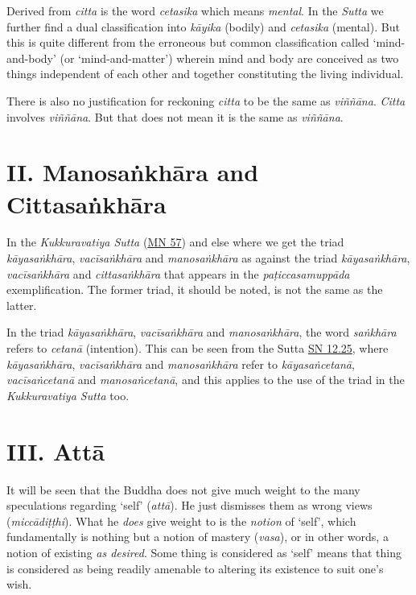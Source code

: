 Derived from \textit{citta} is the word \textit{cetasika} which means \textit{mental}. In the \textit{Sutta} we further find a dual classification into \textit{kāyika} (bodily) and \textit{cetasika} (mental). But this is quite different from the erroneous but common classification called `mind-and-body' (or `mind-and-matter') wherein mind and body are conceived as two things independent of each other and together constituting the living individual.

There is also no justification for reckoning \textit{citta} to be the same as \textit{viññāna}. \textit{Citta} involves \textit{viññāna}. But that does not mean it is the same as \textit{viññāna}.

\hypertarget{_ii_manosaux1e45khux101ra_and_cittasaux1e45khux101ra}{%
\section{II. Manosaṅkhāra and Cittasaṅkhāra}\label{_ii_manosaux1e45khux101ra_and_cittasaux1e45khux101ra}}

In the \textit{Kukkuravatiya Sutta} (\href{https://suttacentral.net/mn57/en/bodhi}{MN 57}) and else where we get the triad \textit{kāyasaṅkhāra}, \textit{vacīsaṅkhāra} and \textit{manosaṅkhāra} as against the triad \textit{kāyasaṅkhāra}, \textit{vacīsaṅkhāra} and \textit{cittasaṅkhāra} that appears in the \textit{paṭiccasamuppāda} exemplification. The former triad, it should be noted, is not the same as the latter.

In the triad \textit{kāyasaṅkhāra}, \textit{vacīsaṅkhāra} and \textit{manosaṅkhāra}, the word \textit{saṅkhāra} refers to \textit{cetanā} (intention). This can be seen from the Sutta \href{https://suttacentral.net/sn12.25/en/bodhi}{SN 12.25}, where \textit{kāyasaṅkhāra}, \textit{vacīsaṅkhāra} and \textit{manosaṅkhāra} refer to \textit{kāyasaṅcetanā}, \textit{vacīsaṅcetanā} and \textit{manosaṅcetanā}, and this applies to the use of the triad in the \textit{Kukkuravatiya Sutta} too.

\hypertarget{_iii_attux101}{%
\section{III. Attā}\label{_iii_attux101}}

It will be seen that the Buddha does not give much weight to the many speculations regarding `self' (\textit{attā}). He just dismisses them as wrong views (\textit{miccādiṭṭhi}). What he \emph{does} give weight to is the \emph{notion} of `self', which fundamentally is nothing but a notion of mastery (\textit{vasa}), or in other words, a notion of existing \emph{as desired}. Some thing is considered as `self' means that thing is considered as being readily amenable to altering its existence to suit one's wish.

